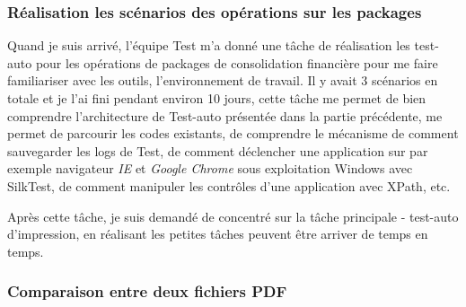     \subsubsection{Réalisation les scénarios des opérations sur les packages}
    Quand je suis arrivé, l'équipe Test m'a donné une tâche de réalisation les test-auto pour les opérations de packages de consolidation financière pour me faire familiariser avec les outils, l'environnement de travail. Il y avait 3 scénarios en totale et je l'ai fini pendant environ 10 jours, cette tâche me permet de bien comprendre l'architecture de Test-auto présentée dans la partie précédente, me permet de parcourir les codes existants, de comprendre le mécanisme de comment sauvegarder les logs de Test, de comment déclencher une application sur par exemple navigateur \textit{IE} et \textit{Google Chrome} sous exploitation Windows avec SilkTest, de comment manipuler les contrôles d'une application avec XPath, etc.
    
    \par Après cette tâche, je suis demandé de concentré sur la tâche principale - test-auto d'impression, en réalisant les petites tâches peuvent être arriver de temps en temps. 
    \subsubsection{Comparaison entre deux fichiers PDF}
    
